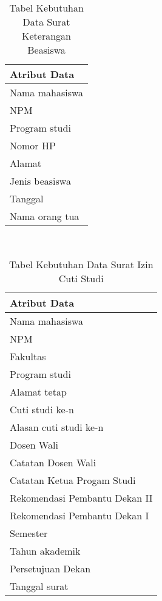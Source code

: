 \
\begin{table}[H]
\centering
\caption{Tabel Kebutuhan Data Surat Keterangan Beasiswa}
\label{surat_keterangan_beasiswa}
\begin{tabular}{|l|}
\hline
{\textbf{Atribut Data}}                     \\ \hline
{Nama mahasiswa}                            \\ \hline 
{NPM}                                       \\ \hline 
{Program studi}                             \\ \hline
{Nomor HP}			                            \\ \hline
{Alamat}        			                     	\\ \hline
{Jenis beasiswa}                            \\ \hline 
{Tanggal}                                   \\ \hline 
{Nama orang tua}                            \\ \hline
\end{tabular}
\end{table}
\
\begin{table}[H]
\centering
\caption{Tabel Kebutuhan Data Surat Izin Cuti Studi}
\label{surat_izin_cuti_studi}
\begin{tabular}{|l|}
\hline
{\textbf{Atribut Data}}                     \\ \hline
{Nama mahasiswa}                            \\ \hline 
{NPM}                                       \\ \hline 
{Fakultas}                                  \\ \hline 
{Program studi}                             \\ \hline 
{Alamat tetap}                              \\ \hline
{Cuti studi ke-n}   			                	\\ \hline 
{Alasan cuti studi ke-n}                    \\ \hline
{Dosen Wali}				                        \\ \hline 
{Catatan Dosen Wali}                        \\ \hline
{Catatan Ketua Progam Studi}                \\ \hline 
{Rekomendasi Pembantu Dekan II}             \\ \hline 
{Rekomendasi Pembantu Dekan I}              \\ \hline 
{Semester}                          		    \\ \hline 
{Tahun akademik}                            \\ \hline
{Persetujuan Dekan}                         \\ \hline 
{Tanggal surat}                             \\ \hline
\end{tabular}
\end{table}

